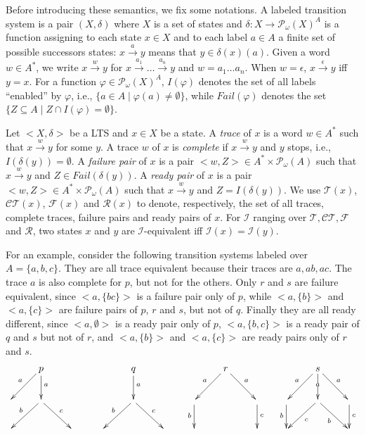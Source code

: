 \documentclass{LMCS}
\def\tr#1{\stackrel{#1}{\to}}
\def\pow#1{{\mathcal P_\omega}#1}
\begin{document}
\bigskip

Before introducing these semantics, we fix some notations. A
labeled transition system is a pair $(X, \delta)$ where $X$ is a set
of states and $\delta\colon X \to \pow(X)^A$ is a function assigning to
each state $x\in X$ and to each label $a\in A$ a finite set of possible
successors states: $x\tr{a}y$ means that $y\in \delta(x)(a)$. Given a
word $w \in A^*$, we write $x\tr{w}y$ for $x\tr{a_1}\dots \tr{a_n}y$
and $w=a_1 \dots a_n$. When $w=\epsilon$, $x\tr{\epsilon}y$ iff
$y=x$.
For a function $\varphi\in \pow(X)^A$, $I(\varphi)$ denotes the set
of all labels ``enabled'' by $\varphi$, i.e., $\{a\in A \mid
\varphi(a)\neq \emptyset\}$, while $\textit{Fail}(\varphi)$ denotes the set
$\{Z \subseteq A \mid Z \cap I(\varphi)=\emptyset\}$.




Let $<X, \delta>$ be a LTS and $x\in X$ be a state. A \emph{trace}
of $x$ is a word $w \in A^*$ such that $x \tr{w}y$ for some $y$. A
trace $w$ of $x$ is \emph{complete} if $x\tr{w}y$ and $y$ stops,
i.e., $I(\delta(y))=\emptyset$. A \emph{failure pair} of $x$ is a
pair $<w, Z>\in A^*\times \pow(A)$ such that $x\tr{w}y$ and $Z\in
\textit{Fail}(\delta(y))$. A \emph{ready pair} of $x$ is a pair $<w, Z>\in A^*\times \pow(A)$ such
that $x\tr{w}y$ and $Z = I(\delta (y))$. We use $\mathcal{T}(x)$,
$\mathcal{CT}(x)$, $\mathcal{F}(x)$ and $\mathcal{R}(x)$ to denote,
respectively, the set of all traces, complete traces, failure pairs
and ready pairs of $x$. For $\mathcal{I}$ ranging over $\mathcal{T},
\mathcal{CT}, \mathcal{F}$ and $\mathcal{R}$, two states $x$ and $y$
are $\mathcal{I}$-equivalent iff $\mathcal{I}(x)=\mathcal{I}(y)$.

\bigskip

For an example, consider the following transition systems
labeled over $A=\{a,b,c\}$. They are all trace equivalent because
their traces are $a,ab,ac$. The trace $a$ is also complete for $p$,
but not for the others. Only $r$ and $s$ are failure equivalent,
since $<a,\{bc\}>$ is a failure pair only of $p$, while $<a,\{b\}>$
and $<a,\{c\}>$ are failure pairs of $p$, $r$ and $s$, but not of
$q$. Finally they are all ready different, since $<a,\emptyset>$ is
a ready pair only of $p$, $<a,\{b,c\}>$ is a ready pair of $q$ and
$s$ but not of $r$, and $<a,\{b\}>$ and $<a,\{c\}>$ are ready pairs
only of $r$ and $s$.
\[
\xymatrix{& p \ar[d]^{a} \ar[dl]_{a} & && q \ar[d]^{a} & && r \ar[dr]^{a}\ar[dl]_{a} & && s \ar[d]|a \ar[dr]^{a}\ar[dl]_{a} \\
 &\ar[dr]^{c}\ar[dl]_{b}& & & \ar[dr]^{c}\ar[dl]_{b}& & \ar[d]_{b}&& \ar[d]^{c} &   \ar[d]_b& \ar[rd]_b\ar[ld]^c& \ar[d]^c\\
 &&  & && &&  & &&& }
\]
\end{document}
